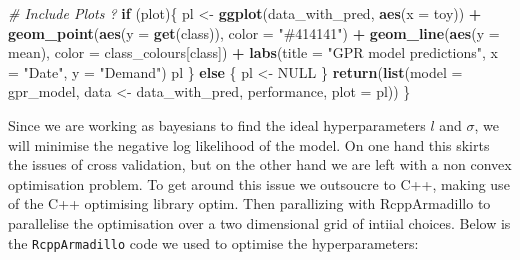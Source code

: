 \documentclass[
]{article}
\newenvironment{Shaded}{\begin{snugshade}}{\end{snugshade}}
\newcommand{\CommentTok}[1]{\textcolor[rgb]{0.56,0.35,0.01}{\textit{#1}}}
\newcommand{\ControlFlowTok}[1]{\textcolor[rgb]{0.13,0.29,0.53}{\textbf{#1}}}
\newcommand{\DataTypeTok}[1]{\textcolor[rgb]{0.13,0.29,0.53}{#1}}
\newcommand{\KeywordTok}[1]{\textcolor[rgb]{0.13,0.29,0.53}{\textbf{#1}}}
\newcommand{\NormalTok}[1]{#1}
\newcommand{\OperatorTok}[1]{\textcolor[rgb]{0.81,0.36,0.00}{\textbf{#1}}}
\newcommand{\OtherTok}[1]{\textcolor[rgb]{0.56,0.35,0.01}{#1}}
\newcommand{\StringTok}[1]{\textcolor[rgb]{0.31,0.60,0.02}{#1}}
\begin{document}
\begin{Shaded}
\begin{Highlighting}[]
  \CommentTok{\# Include Plots ?}
  \ControlFlowTok{if}\NormalTok{ (plot)\{}
\NormalTok{    pl \textless{}{-}}\StringTok{ }\KeywordTok{ggplot}\NormalTok{(data\_with\_pred, }\KeywordTok{aes}\NormalTok{(}\DataTypeTok{x =}\NormalTok{ toy)) }\OperatorTok{+}
\StringTok{      }\KeywordTok{geom\_point}\NormalTok{(}\KeywordTok{aes}\NormalTok{(}\DataTypeTok{y =} \KeywordTok{get}\NormalTok{(class)), }\DataTypeTok{color =} \StringTok{"\#414141"}\NormalTok{) }\OperatorTok{+}
\StringTok{      }\KeywordTok{geom\_line}\NormalTok{(}\KeywordTok{aes}\NormalTok{(}\DataTypeTok{y =}\NormalTok{ mean), }\DataTypeTok{color =}\NormalTok{ class\_colours[class]) }\OperatorTok{+}
\StringTok{      }\KeywordTok{labs}\NormalTok{(}\DataTypeTok{title =} \StringTok{"GPR model predictions"}\NormalTok{,}
           \DataTypeTok{x =} \StringTok{"Date"}\NormalTok{, }\DataTypeTok{y =} \StringTok{"Demand"}\NormalTok{)}
\NormalTok{    pl}
\NormalTok{  \} }\ControlFlowTok{else}\NormalTok{ \{}
\NormalTok{    pl \textless{}{-}}\StringTok{ }\OtherTok{NULL}
\NormalTok{  \}}
  \KeywordTok{return}\NormalTok{(}\KeywordTok{list}\NormalTok{(}\DataTypeTok{model =}\NormalTok{ gpr\_model,}
\NormalTok{              data \textless{}{-}}\StringTok{ }\NormalTok{data\_with\_pred,}
\NormalTok{              performance,}
              \DataTypeTok{plot =}\NormalTok{ pl))}
\NormalTok{\}}
\end{Highlighting}
\end{Shaded}

Since we are working as bayesians to find the ideal hyperparameters
\(l\) and \(\sigma\), we will minimise the negative log likelihood of
the model. On one hand this skirts the issues of cross validation, but
on the other hand we are left with a non convex optimisation problem. To
get around this issue we outsoucre to C++, making use of the C++
optimising library optim. Then parallizing with RcppArmadillo to
parallelise the optimisation over a two dimensional grid of intiial
choices. Below is the \texttt{RcppArmadillo} code we used to optimise
the hyperparameters:
\end{document}
